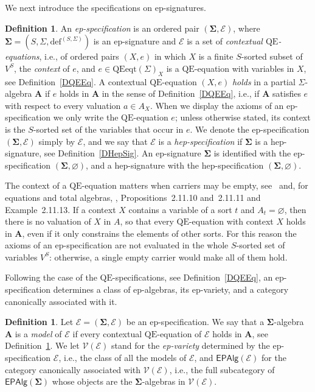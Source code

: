 \documentclass[a4paper, reqno]{amsbook}
\newcommand{\sig}[1]{\mathbf{#1}}             %
\newcommand{\spec}[1]{\boldsymbol{\mathcal{#1}}} %
\newcommand{\QE}{\mathrm{QE}}
\theoremstyle{plain}
\theoremstyle{definition}
\newtheorem{definition}[theorem]{Definition}
\begin{document}
We next introduce the specifications on ep-signatures.

\begin{definition}\label{DEpSpec}
An \emph{ep-specification} is an ordered pair $(\sig{\Sigma},\mathcal{E})$, where $\sig{\Sigma}=(S,\Sigma,\mathrm{def}^{(S,\Sigma)})$ is an ep-signature and $\mathcal{E}$ is a set of \emph{contextual $\QE$-equations}, i.e., of ordered pairs $(X,e)$ in which $X$ is a finite $S$-sorted subset of $V^{S}$, the \emph{context} of $e$, and $e\in\mathrm{QEeqt}(\Sigma)_{X}$ is a $\QE$-equation with variables in $X$, see Definition~\ref{DQEEq}.
A contextual $\QE$-equation $(X,e)$ \emph{holds} in a partial $\Sigma$-algebra $\mathbf{A}$ if $e$ holds in $\mathbf{A}$ in the sense of Definition~\ref{DQEEq}, i.e., if $\mathbf{A}$ satisfies $e$ with respect to every valuation $a\in A_{X}$.
When we display the axioms of an ep-specification we only write the $\QE$-equation $e$; unless otherwise stated, its context is the $S$-sorted set of the variables that occur in $e$.
We denote the ep-specification $(\sig{\Sigma},\mathcal{E})$ simply by $\spec{E}$, and we say that $\spec{E}$ is a \emph{hep-specification} if $\sig{\Sigma}$ is a hep-signature, see Definition~\ref{DHepSig}.
An ep-signature $\sig{\Sigma}$ is identified with the ep-specification $(\sig{\Sigma},\varnothing)$, and a hep-signature with the hep-specification $(\sig{\Sigma},\varnothing)$.
\end{definition}

The context of a $\QE$-equation matters when carriers may be empty, see~\cite{GoguenMeseguer1985} and, for equations and total algebras, \cite{Soliveres2000}, Propositions~2.11.10 and~2.11.11 and Example~2.11.13.
If a context $X$ contains a variable of a sort $t$ and $A_{t}=\varnothing$, then there is no valuation of $X$ in $A$, so that every $\QE$-equation with context $X$ holds in $\mathbf{A}$, even if it only constrains the elements of other sorts.
For this reason the axioms of an ep-specification are not evaluated in the whole $S$-sorted set of variables $V^{S}$: otherwise, a single empty carrier would make all of them hold.

Following the case of the $\QE$-specifications, see Definition~\ref{DQEEq}, an ep-specification determines a class of ep-algebras, its ep-variety, and a category canonically associated with it.

\begin{definition}\label{DEpVariety}
Let $\spec{E}=(\sig{\Sigma},\mathcal{E})$ be an ep-specification.
We say that a $\sig{\Sigma}$-algebra $\mathbf{A}$ is a \emph{model} of $\spec{E}$ if every contextual $\QE$-equation of $\mathcal{E}$ holds in $\mathbf{A}$, see Definition~\ref{DEpSpec}.
We let $\mathcal{V}(\spec{E})$ stand for the \emph{ep-variety} determined by the ep-specification $\spec{E}$, i.e., the class of all the models of $\spec{E}$, and $\mathsf{EPAlg}(\spec{E})$ for the category canonically associated with $\mathcal{V}(\spec{E})$, i.e., the full subcategory of $\mathsf{EPAlg}(\sig{\Sigma})$ whose objects are the $\sig{\Sigma}$-algebras in $\mathcal{V}(\spec{E})$.
\end{definition}
\end{document}

